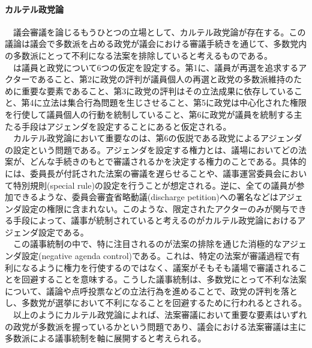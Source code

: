 \paragraph*{カルテル政党論}
　議会審議を論じるもうひとつの立場として、カルテル政党論\citep*{Cox2005-pn,Cox2007-xq}が存在する。この議論は議会で多数派を占める政党が議会における審議手続きを通じて、多数党内の多数派にとって不利になる法案を排除していると考えるものである。\\
　\citet*{Cox2005-pn,Cox2007-xq}は議員と政党について6つの仮定を設定する。第1に、議員が再選を追求するアクターであること、第2に政党の評判が議員個人の再選と政党の多数派維持のために重要な要素であること、第3に政党の評判はその立法成果に依存していること、第4に立法は集合行為問題を生じさせること、第5に政党は中心化された権限を行使して議員個人の行動を統制していること、第6に政党が議員を統制する主たる手段はアジェンダを設定することにあると仮定される。\\
　カルテル政党論において重要なのは、第6の仮説である政党によるアジェンダの設定という問題である。アジェンダを設定する権力とは、議場においてどの法案が、どんな手続きのもとで審議されるかを決定する権力のことである。具体的には、委員長が付託された法案の審議を遅らせることや、議事運営委員会において特別規則(special rule)の設定を行うことが想定される。逆に、全ての議員が参加できるような、委員会審査省略動議(discharge petition)への署名などはアジェンダ設定の権限に含まれない。このような、限定されたアクターのみが関与できる手段によって、議事が統制されていると考えるのがカルテル政党論におけるアジェンダ設定である。\\
　この議事統制の中で、特に注目されるのが法案の排除を通じた消極的なアジェンダ設定(negative agenda control)である。これは、特定の法案が審議過程で有利になるように権力を行使するのではなく、議案がそもそも議場で審議されることを回避することを意味する。こうした議事統制は、多数党にとって不利な法案について、議論や点呼投票などの立法行為を進めることで、政党の評判を落とし、多数党が選挙において不利になることを回避するために行われるとされる。\\
　以上のようにカルテル政党論によれば、法案審議において重要な要素はいずれの政党が多数派を握っているかという問題であり、議会における法案審議は主に多数派による議事統制を軸に展開すると考えられる。

